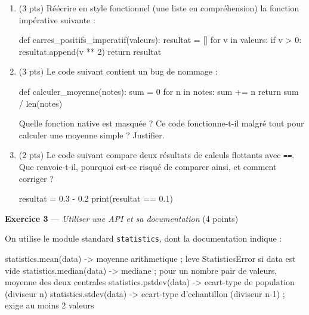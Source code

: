 \begin{enumerate}
  \item (3 pts) Réécrire en style fonctionnel (une liste en compréhension) la fonction impérative suivante :
\begin{python}
def carres_positifs_imperatif(valeurs):
    resultat = []
    for v in valeurs:
        if v > 0:
            resultat.append(v ** 2)
    return resultat
\end{python}
  \item (3 pts) Le code suivant contient un bug de nommage :
\begin{python}
def calculer_moyenne(notes):
    sum = 0
    for n in notes:
        sum += n
    return sum / len(notes)
\end{python}
    Quelle fonction native est masquée ? Ce code fonctionne-t-il malgré tout pour calculer une moyenne simple ? Justifier.
  \item (2 pts) Le code suivant compare deux résultats de calculs flottants avec \lstinline{==}. Que renvoie-t-il, pourquoi est-ce risqué de comparer ainsi, et comment corriger ?
\begin{python}
resultat = 0.3 - 0.2
print(resultat == 0.1)
\end{python}
\end{enumerate}

%
%

\bigskip

\textbf{Exercice 3} --- \textit{Utiliser une API et sa documentation} \hfill (4 points)

On utilise le module standard \lstinline{statistics}, dont la documentation indique :

\begin{console}
statistics.mean(data)      -> moyenne arithmetique ; leve StatisticsError si data est vide
statistics.median(data)    -> mediane ; pour un nombre pair de valeurs, moyenne des deux centrales
statistics.pstdev(data)    -> ecart-type de population (diviseur n)
statistics.stdev(data)     -> ecart-type d'echantillon (diviseur n-1) ; exige au moins 2 valeurs
\end{console}

